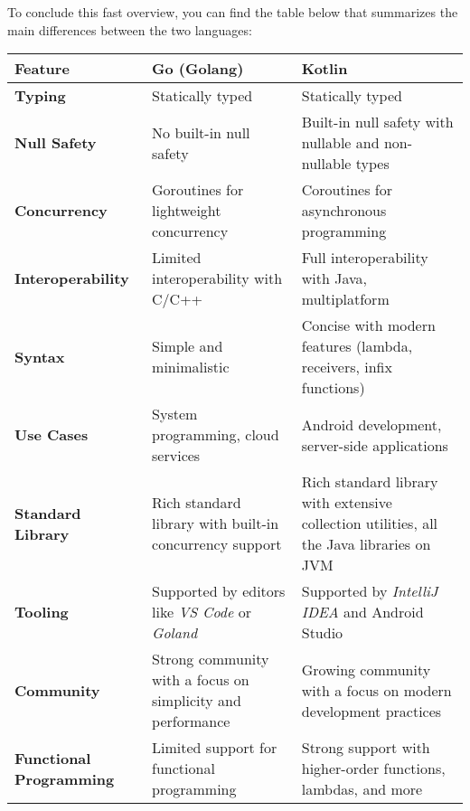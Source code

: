 To conclude this fast overview, you can find the table below that summarizes the main differences between the two languages:

\begin{center}
	\begin{tabular}{|>{\raggedright\arraybackslash}p{3cm}|>{\raggedright\arraybackslash}p{5cm}|>{\raggedright\arraybackslash}p{5cm}|}
		\hline
		\textbf{Feature} & \textbf{Go (Golang)} & \textbf{Kotlin} \\
		\hline
		\textbf{Typing} & Statically typed & Statically typed \\
		\hline
		\textbf{Null Safety} & No built-in null safety & Built-in null safety with nullable and non-nullable types \\
		\hline
		\textbf{Concurrency} & Goroutines for lightweight concurrency & Coroutines for asynchronous programming \\
		\hline
		\textbf{Interoperability} & Limited interoperability with C/C++ & Full interoperability with Java, multiplatform \\
		\hline
		\textbf{Syntax} & Simple and minimalistic & Concise with modern features (lambda, receivers, infix functions) \\
		\hline
		\textbf{Use Cases} & System programming, cloud services & Android development, server-side applications \\
		\hline
		\textbf{Standard Library} & Rich standard library with built-in concurrency support & Rich standard library with extensive collection utilities, all the Java libraries on \Kotlin JVM \\
		\hline
		\textbf{Tooling} & Supported by editors like \textit{VS Code} or \textit{Goland} & Supported by \textit{IntelliJ IDEA} and Android Studio \\
		\hline
		\textbf{Community} & Strong community with a focus on simplicity and performance & Growing community with a focus on modern development practices \\
		\hline
		\textbf{Functional Programming} & Limited support for functional programming & Strong support with higher-order functions, lambdas, and more \\
		\hline
	\end{tabular}
\end{center}